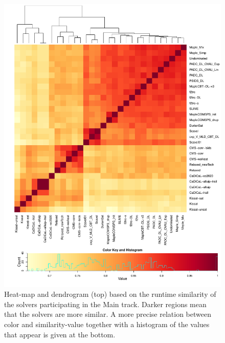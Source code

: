 \documentclass{elsarticle}
\begin{document}
\begin{figure}[tp]
    \centering
    \includegraphics[width=\textwidth]{similarity/cross.pdf}
    \caption{Heat-map and dendrogram (top) based on the runtime similarity of the solvers participating in the Main track.
      Darker regions mean that the solvers are more similar.
      A more precise relation between color and similarity-value together with a histogram of the values that appear is given at the bottom.
    }
    \label{fig-similarity-main}
\end{figure}

\end{document}
